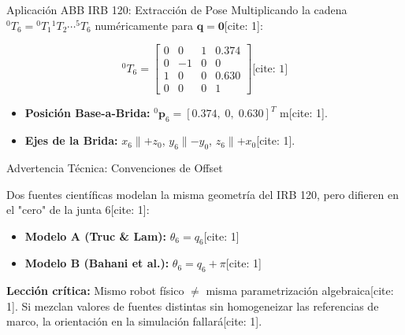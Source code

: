 \documentclass[aspectratio=169, table, xcdraw]{beamer}
\begin{document}
\begin{frame}{Aplicación ABB IRB 120: Extracción de Pose}
    Multiplicando la cadena ${}^{0}T_6 = {}^{0}T_1 {}^{1}T_2 \cdots {}^{5}T_6$ numéricamente para $\mathbf{q}=\mathbf{0}$[cite: 1]:
    
    \begin{equation*}
        \boxed{
        {}^{0}T_6 =
        \begin{bmatrix}
        0 & 0 & 1 & 0.374 \\
        0 & -1 & 0 & 0 \\
        1 & 0 & 0 & 0.630 \\
        0 & 0 & 0 & 1
        \end{bmatrix}
        } \text{[cite: 1]}
    \end{equation*}

    \begin{itemize}
        \item \textbf{Posición Base-a-Brida:} ${}^{0}\mathbf{p}_6 = [0.374, \; 0, \; 0.630]^T \text{ m}$[cite: 1].
        \item \textbf{Ejes de la Brida:} $x_6 \parallel +z_0$, $y_6 \parallel -y_0$, $z_6 \parallel +x_0$[cite: 1].
    \end{itemize}
\end{frame}

\begin{frame}{Advertencia Técnica: Convenciones de Offset}
    \begin{tcolorbox}[colback=white, colframe=ucbblue, title=Modelos Públicos Discrepantes para el IRB 120]
        Dos fuentes científicas modelan la misma geometría del IRB 120, pero difieren en el "cero" de la junta 6[cite: 1]:
        
        \begin{itemize}
            \item \textbf{Modelo A (Truc \& Lam):} $\theta_6 = q_6$[cite: 1]
            \item \textbf{Modelo B (Bahani et al.):} $\theta_6 = q_6 + \pi$[cite: 1]
        \end{itemize}
        
        \textbf{Lección crítica:} Mismo robot físico $\neq$ misma parametrización algebraica[cite: 1]. Si mezclan valores de fuentes distintas sin homogeneizar las referencias de marco, la orientación en la simulación fallará[cite: 1].
    \end{tcolorbox}
\end{frame}
\end{document}
